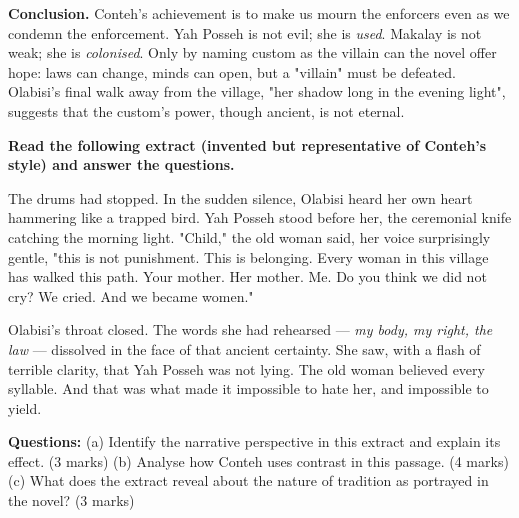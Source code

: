 \documentclass[11pt]{article}
\begin{document}
\begin{corrige}
\textbf{Conclusion.} Conteh's achievement is to make us mourn the enforcers even as we condemn the enforcement. Yah Posseh is not evil; she is \emph{used}. Makalay is not weak; she is \emph{colonised}. Only by naming custom as the villain can the novel offer hope: laws can change, minds can open, but a "villain" must be defeated. Olabisi's final walk away from the village, "her shadow long in the evening light", suggests that the custom's power, though ancient, is not eternal.
\end{corrige}

\begin{exercice}
\textbf{Read the following extract (invented but representative of Conteh's style) and answer the questions.}

The drums had stopped. In the sudden silence, Olabisi heard her own heart hammering like a trapped bird. Yah Posseh stood before her, the ceremonial knife catching the morning light. "Child," the old woman said, her voice surprisingly gentle, "this is not punishment. This is belonging. Every woman in this village has walked this path. Your mother. Her mother. Me. Do you think we did not cry? We cried. And we became women."

Olabisi's throat closed. The words she had rehearsed --- \emph{my body, my right, the law} --- dissolved in the face of that ancient certainty. She saw, with a flash of terrible clarity, that Yah Posseh was not lying. The old woman believed every syllable. And that was what made it impossible to hate her, and impossible to yield.

\textbf{Questions:}
(a) Identify the narrative perspective in this extract and explain its effect. (3 marks)
(b) Analyse how Conteh uses contrast in this passage. (4 marks)
(c) What does the extract reveal about the nature of tradition as portrayed in the novel? (3 marks)
\end{exercice}
\end{document}
